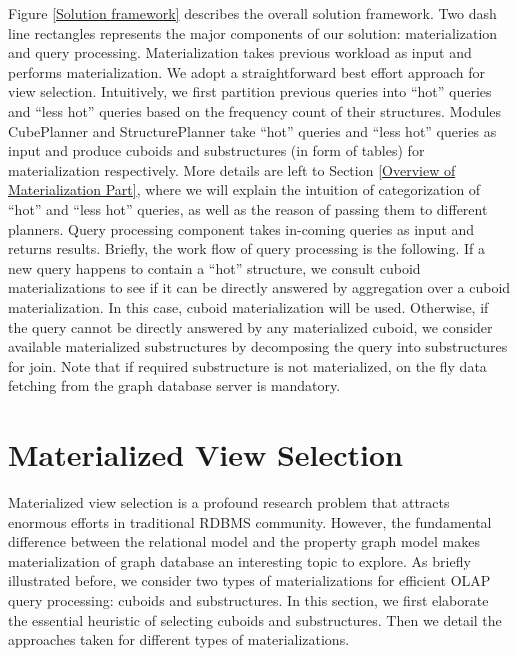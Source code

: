 Figure \ref{Solution framework} describes the overall solution framework. Two dash line rectangles represents the major components of our solution: materialization and query processing. Materialization takes previous workload as input and performs materialization. We adopt a straightforward best effort approach for view selection. Intuitively, we first partition previous queries into ``hot'' queries and ``less hot'' queries based on the frequency count of their structures. Modules CubePlanner and StructurePlanner take ``hot'' queries and ``less hot'' queries as input and produce cuboids and substructures (in form of tables) for materialization respectively. More details are left to Section \ref{Overview of Materialization Part}, where we will explain the intuition of categorization of ``hot'' and ``less hot'' queries, as well as the reason of passing them to different planners.  Query processing component takes in-coming queries as input and returns results. Briefly, the work flow of query processing is the following. If a new query happens to contain a ``hot'' structure, we consult cuboid materializations to see if it can be directly answered by aggregation over a cuboid materialization. In this case, cuboid materialization will be used. Otherwise, if the query cannot be directly answered by any materialized cuboid, we consider available materialized substructures by decomposing the query into substructures for join. Note that if required substructure is not materialized, on the fly data fetching from the graph database server is mandatory. %





\section{Materialized View Selection}
\label{Materialization Part}

Materialized view selection is a profound research problem that attracts enormous efforts in traditional RDBMS community. However, the fundamental difference between the relational model and the property graph model makes materialization of graph database an interesting topic to explore. As briefly illustrated before, we consider two types of materializations for efficient OLAP query processing: cuboids and substructures. In this section, we first elaborate the essential heuristic of selecting cuboids and substructures. Then we detail the approaches taken for different types of materializations. 

